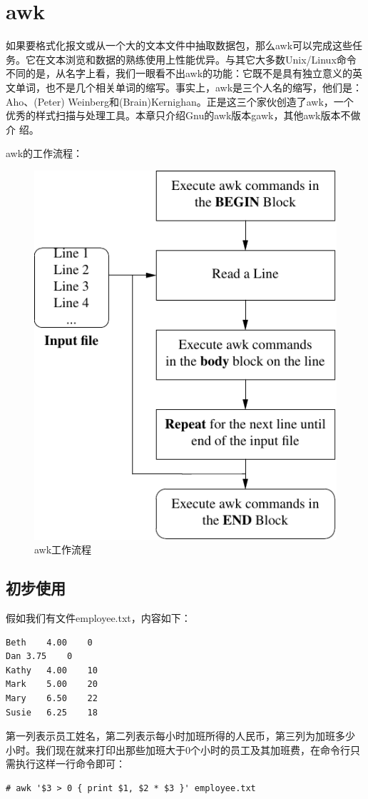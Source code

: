 \chapter{awk}
\label{sec:awk}

如果要格式化报文或从一个大的文本文件中抽取数据包，那么awk可以完成这些任
务。它在文本浏览和数据的熟练使用上性能优异。与其它大多数Unix/Linux命令
不同的是，从名字上看，我们一眼看不出awk的功能：它既不是具有独立意义的英
文单词，也不是几个相关单词的缩写。事实上，awk是三个人名的缩写，他们是：
Aho、(Peter) Weinberg和(Brain)Kernighan。正是这三个家伙创造了awk，一个
优秀的样式扫描与处理工具。本章只介绍Gnu的awk版本gawk，其他awk版本不做介
绍。

awk的工作流程：
\begin{figure}[!htbp]
  \centering
  \includegraphics[width=.5\textwidth]{graph/awk_workflow.pdf}
  \caption{awk工作流程}
  \label{fig:awk_workflow}
\end{figure}

\section{初步使用}
\label{sec:FirstAwk}

假如我们有文件employee.txt，内容如下：

\begin{verbatim}
Beth	4.00	0
Dan	3.75	0
Kathy	4.00	10
Mark	5.00	20
Mary	6.50	22
Susie	6.25	18
\end{verbatim}

第一列表示员工姓名，第二列表示每小时加班所得的人民币，第三列为加班多少
小时。我们现在就来打印出那些加班大于0个小时的员工及其加班费，在命令行只
需执行这样一行命令即可：

\begin{verbatim}
# awk '$3 > 0 { print $1, $2 * $3 }' employee.txt
\end{verbatim}

